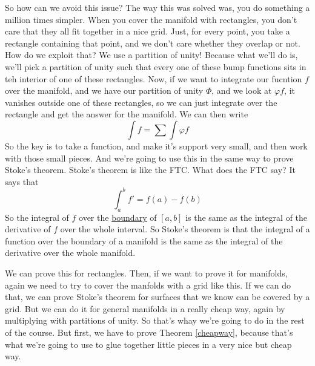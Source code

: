 \documentclass{article}
\begin{document}
So how can we avoid this issue? The way this was solved was, you do something a million times simpler. When you cover the manifold with rectangles, you don't care that they all fit together in a nice grid. Just, for every point, you take a rectangle containing that point, and we don't care whether they overlap or not. How do we exploit that? We use a partition of unity! Because what we'll do is, we'll pick a partition of unity such that every one of these bump functions sits in teh interior of one of these rectangles. Now, if we want to integrate our fucntion \(f\) over the manifold, and we have our partition of unity \(\Phi\), and we look at \(\varphi f\), it vanishes outside one of these rectangles, so we can just integrate over the rectangle and get the answer for the manifold. We can then write
\begin{equation}
  \int f = \sum\int\varphi f
\end{equation}
So the key is to take a function, and make it's support very small, and then work with those small pieces. And we're going to use this in the same way to prove Stoke's theorem. Stoke's theorem is like the FTC. What does the FTC say? It says that
\begin{equation}
  \int_a^bf' = f(a) - f(b)
\end{equation}
So the integral of \(f\) over the \underline{boundary} of \([a, b]\) is the same as the integral of the derivative of \(f\) over the whole interval. So Stoke's theorem is that the integral of a function over the boundary of a manifold is the same as the integral of the derivative over the whole manifold.

We can prove this for rectangles. Then, if we want to prove it for manifolds, again we need to try to cover the manfolds with a grid like this. If we can do that, we can prove Stoke's theorem for surfaces that we know can be covered by a grid. But we can do it for general manifolds in a really cheap way, again by multiplying with partitions of unity. So that's whay we're going to do in the rest of the course. But first, we have to prove Theorem \ref{cheapway}, because that's what we're going to use to glue together little pieces in a very nice but cheap way.
\end{document}
